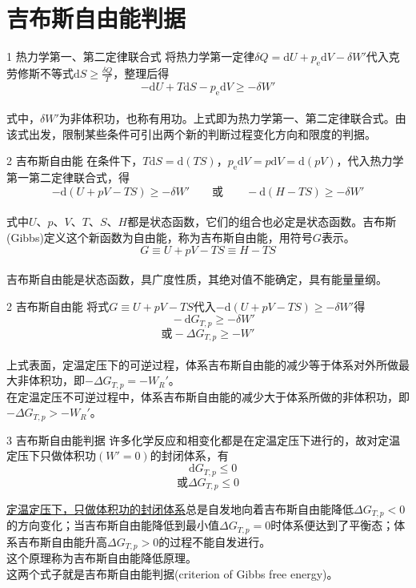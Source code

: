 \section{吉布斯自由能判据}

\begin{frame}{1 热力学第一、第二定律联合式}
    将热力学第一定律$\delta Q= \mathrm{d}U+p_\mathrm{e}\mathrm{d}V-\delta W'$代入克劳修斯不等式$\mathrm{d}S\ge\frac{\delta Q}{T}$，整理后得
    $$-\mathrm{d}U+T\mathrm{d}S-p_\mathrm{e}\mathrm{d}V\ge-\delta W'$$
    \\式中，$\delta W'$为非体积功，也称有用功。上式即为热力学第一、第二定律联合式。由该式出发，限制某些条件可引出两个新的判断过程变化方向和限度的判据。
\end{frame}


\begin{frame}{2 吉布斯自由能}
    在条件下，$T\mathrm{d}S=\mathrm{d}(TS)$，$p_\mathrm{e}\mathrm{d}V=p\mathrm{d}V=\mathrm{d}(pV)$，代入热力学第一第二定律联合式，得
    $$-\mathrm{d}(U+pV-TS)\ge -\delta W' \qquad \text{或}\qquad -\mathrm{d}(H-TS)\ge -\delta W'$$
    \\式中$U$、$p$、$V$、$T$、$S$、$H$都是状态函数，它们的组合也必定是状态函数。吉布斯(Gibbs)定义这个新函数为自由能，称为吉布斯自由能，用符号$G$表示。
    $$G\equiv U+pV-TS\equiv H-TS$$
    \\吉布斯自由能是状态函数，具广度性质，其绝对值不能确定，具有能量量纲。
\end{frame}


\begin{frame}{2 吉布斯自由能}
    将式$G\equiv U+pV-TS$代入$-\mathrm{d}(U+pV-TS)\ge -\delta W'$得
    $$~~~~-\mathrm{d}G_{T,p}\ge -\delta W'$$
    $$\text{或} -\Delta G_{T,p}\ge -W'$$
    \\上式表面，定温定压下的可逆过程，体系吉布斯自由能的减少等于体系对外所做最大非体积功，即$-\Delta G_{T,p}= -W_R'$。
    \\在定温定压不可逆过程中，体系吉布斯自由能的减少大于体系所做的非体积功，即$-\Delta G_{T,p}> -W_R'$。
\end{frame}


\begin{frame}{3 吉布斯自由能判据}
    许多化学反应和相变化都是在定温定压下进行的，故对定温定压下只做体积功$(W'=0)$的封闭体系，有
    $$~~~~\mathrm{d}G_{T,p}\le 0$$
    $$\text{或}\Delta G_{T,p}\le 0$$
    
    \uline{定温定压下，只做体积功的封闭体系}总是自发地向着吉布斯自由能降低$\Delta G_{T,p}< 0$的方向变化；当吉布斯自由能降低到最小值$\Delta G_{T,p}= 0$时体系便达到了平衡态；体系吉布斯自由能升高$\Delta G_{T,p}> 0$的过程不能自发进行。
    \\这个原理称为吉布斯自由能降低原理。
    \\这两个式子就是吉布斯自由能判据(criterion of Gibbs free energy)。
\end{frame}


